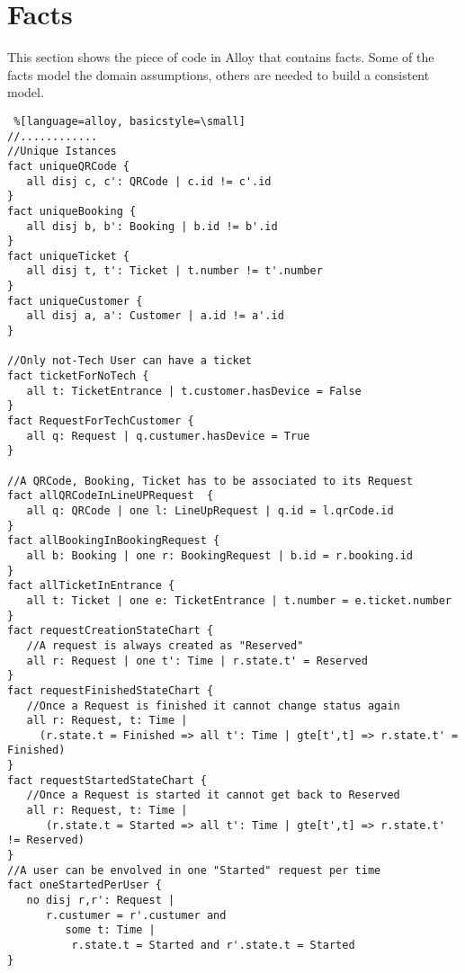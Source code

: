 \section{Facts}
This section shows the piece of code in Alloy that contains facts.
Some of the facts model the domain assumptions, others are needed to build a consistent model.
\begin{lstlisting} %[language=alloy, basicstyle=\small]
//............
//Unique Istances
fact uniqueQRCode {
   all disj c, c': QRCode | c.id != c'.id
}
fact uniqueBooking {
   all disj b, b': Booking | b.id != b'.id
}
fact uniqueTicket {
   all disj t, t': Ticket | t.number != t'.number
}
fact uniqueCustomer {
   all disj a, a': Customer | a.id != a'.id
}

//Only not-Tech User can have a ticket
fact ticketForNoTech {
   all t: TicketEntrance | t.customer.hasDevice = False
}
fact RequestForTechCustomer {
   all q: Request | q.custumer.hasDevice = True
}

//A QRCode, Booking, Ticket has to be associated to its Request
fact allQRCodeInLineUPRequest  {
   all q: QRCode | one l: LineUpRequest | q.id = l.qrCode.id
}
fact allBookingInBookingRequest {
   all b: Booking | one r: BookingRequest | b.id = r.booking.id
}
fact allTicketInEntrance {
   all t: Ticket | one e: TicketEntrance | t.number = e.ticket.number
}
fact requestCreationStateChart {
   //A request is always created as "Reserved"
   all r: Request | one t': Time | r.state.t' = Reserved	
}
fact requestFinishedStateChart {
   //Once a Request is finished it cannot change status again
   all r: Request, t: Time |
     (r.state.t = Finished => all t': Time | gte[t',t] => r.state.t' = Finished)	
}
fact requestStartedStateChart {
   //Once a Request is started it cannot get back to Reserved
   all r: Request, t: Time |
      (r.state.t = Started => all t': Time | gte[t',t] => r.state.t' != Reserved)	
}
//A user can be envolved in one "Started" request per time
fact oneStartedPerUser {
   no disj r,r': Request |
      r.custumer = r'.custumer and
         some t: Time |
	      r.state.t = Started and r'.state.t = Started
}
\end{lstlisting}








 
 